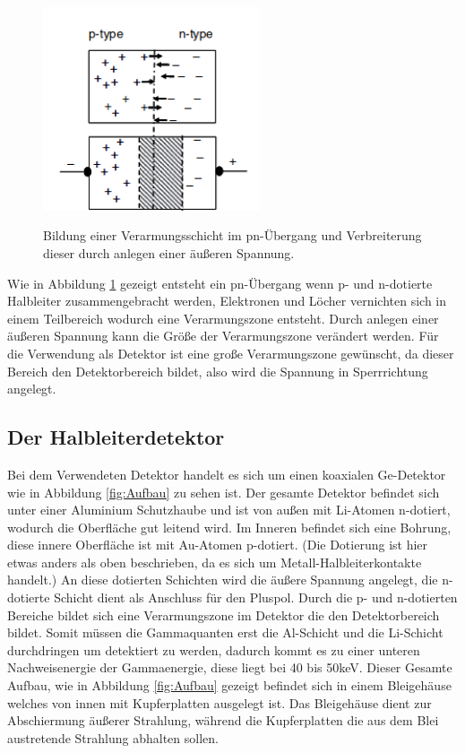 \begin{figure}[H]
  \centering
  \includegraphics[height=6cm]{pn.png}
  \caption{Bildung einer Verarmungsschicht im pn-Übergang und Verbreiterung dieser durch
  anlegen einer äußeren Spannung.}
  \label{fig:pn}
  \cite{Gilmore2}
\end{figure}

Wie in Abbildung \ref{fig:pn} gezeigt entsteht ein pn-Übergang wenn p- und n-dotierte Halbleiter zusammengebracht werden,
Elektronen und Löcher vernichten sich in einem Teilbereich wodurch eine Verarmungszone entsteht.
Durch anlegen einer äußeren Spannung kann die Größe der Verarmungszone verändert werden. Für die
Verwendung als Detektor ist eine große Verarmungszone gewünscht, da dieser Bereich den
Detektorbereich bildet, also wird die Spannung in Sperrrichtung angelegt.


\subsection{Der Halbleiterdetektor}
Bei dem Verwendeten Detektor handelt es sich um einen koaxialen Ge-Detektor wie in Abbildung
\ref{fig:Aufbau} zu sehen ist. Der gesamte Detektor befindet sich unter einer Aluminium
Schutzhaube und ist von außen mit Li-Atomen n-dotiert, wodurch die Oberfläche
gut leitend wird. Im Inneren befindet sich eine Bohrung, diese innere Oberfläche ist
mit Au-Atomen p-dotiert. (Die Dotierung ist hier etwas anders als oben beschrieben, da es sich um
Metall-Halbleiterkontakte handelt.) An diese dotierten Schichten wird die
äußere Spannung angelegt, die n-dotierte Schicht dient als Anschluss für den Pluspol.
Durch die p- und n-dotierten Bereiche bildet sich eine
Verarmungszone im Detektor die den Detektorbereich bildet. Somit müssen die Gammaquanten erst
die Al-Schicht und die Li-Schicht durchdringen um detektiert zu werden, dadurch kommt es zu einer
unteren Nachweisenergie der Gammaenergie, diese liegt bei 40 bis 50\;keV.
Dieser Gesamte Aufbau, wie in Abbildung \ref{fig:Aufbau} gezeigt befindet sich in einem
Bleigehäuse welches von innen mit Kupferplatten ausgelegt ist. Das Bleigehäuse dient zur Abschiermung
äußerer Strahlung, während die Kupferplatten die aus dem Blei austretende Strahlung
abhalten sollen.


